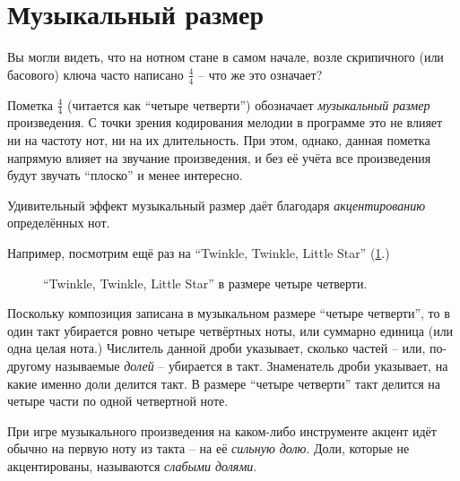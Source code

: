 \documentclass[a4paper,twoside]{book}
\newcounter{example-counter}
\begin{document}
\section{Музыкальный размер}

Вы могли видеть, что на нотном стане в самом начале, возле скрипичного (или
басового) ключа часто написано $\frac{4}{4}$ -- что же это означает?

Пометка $\frac{4}{4}$ (читается как ``четыре четверти'') обозначает
\emph{музыкальный размер} произведения.  С точки зрения кодирования мелодии в
программе это не влияет ни на частоту нот, ни на их длительность.  При этом,
однако, данная пометка напрямую влияет на звучание произведения, и без её учёта
все произведения будут звучать ``плоско'' и менее интересно.

Удивительный эффект музыкальный размер даёт благодаря \emph{акцентированию}
определённых нот.

Например, посмотрим ещё раз на ``Twinkle, Twinkle, Little Star''
(\ref{fig:lilypond-musical-scale-example-1}.)

\begin{figure}[ht]
  \caption{``Twinkle, Twinkle, Little Star'' в размере четыре четверти.}
  \centering
  \label{fig:lilypond-musical-scale-example-1}
\end{figure}

Поскольку композиция записана в музыкальном размере ``четыре четверти'', то в
один такт убирается ровно четыре четвёртных ноты, или суммарно единица (или одна
целая нота.)  Числитель данной дроби указывает, сколько частей -- или, по-другому
называемые \emph{долей} -- убирается в такт.  Знаменатель дроби указывает, на
какие именно доли делится такт.  В размере ``четыре четверти'' такт делится на
четыре части по одной четвертной ноте.

При игре музыкального произведения на каком-либо инструменте акцент идёт обычно
на первую ноту из такта -- на её \emph{сильную долю}.  Доли, которые не
акцентированы, называются \emph{слабыми долями}.
\end{document}
